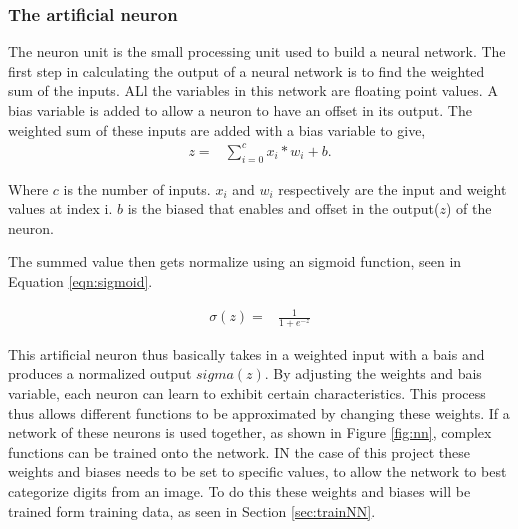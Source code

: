 \subsubsection{The artificial neuron}
The neuron unit is the small processing unit used to build a neural network. The first step in calculating the output of a neural network is to find the weighted sum of the inputs. ALl the variables in this network are floating point values. A bias variable is added to allow a neuron to have an offset in  its output. The weighted sum of these inputs are added with a bias variable to give,
\begin{align}
  z =  &\displaystyle{\sum_{i=0}^{c} x_{i}*w_{i} + b}.
\label{eqn:nnOut}
\end{align}

Where $c$ is the number of inputs. $x_{i}$ and $w_{i}$ respectively are the input and weight values at index i. $b$ is the biased that enables and offset in the output($z$) of the neuron.

The summed value then gets normalize using an sigmoid function, seen in Equation \ref{eqn:sigmoid}.

\begin{align}
  \sigma(z) =  &\displaystyle{\frac{1}{1 + e^{-z}}}
\label{eqn:sigmoid}
\end{align}

This artificial neuron thus basically takes in a weighted input with a bais and produces a normalized output $sigma(z)$. By adjusting the weights and bais variable, each neuron can learn to exhibit certain characteristics. This process thus allows different functions to be approximated by changing these weights. If a network of these neurons is used together, as shown in Figure \ref{fig:nn}, complex functions can be trained onto the network. IN the case of this project these weights and biases needs to be set to specific values, to allow the network to best categorize digits from an image. To do this these weights and biases will be trained form training data, as seen in Section \ref{sec:trainNN}.

